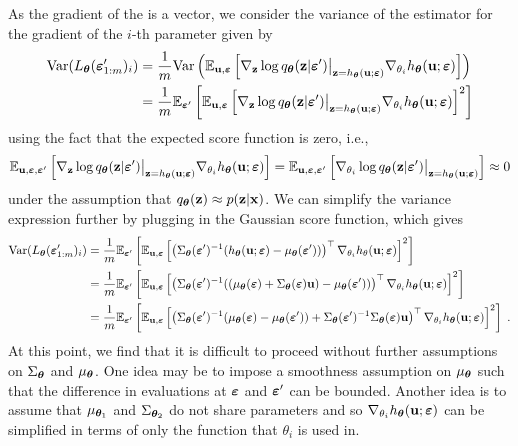 \documentclass[10pt]{article}
\begin{document}
As the gradient of the \elbo is a vector, we consider the variance of the estimator for the gradient of the $i$-th parameter given by
\begin{align*}
\mathrm{Var}(L_{\bm{\theta}}(\bm{\varepsilon}_{1:m}')_i) &= \frac{1}{m}\mathrm{Var}\left(\mathbb{E}_{\mathbf{u},\bm{\varepsilon}}\left[\nabla_{\mathbf{z}}\log q_{\bm{\theta}}(\mathbf{z}|\bm{\varepsilon}')\big|_{\mathbf{z}=h_{\bm{\theta}}(\mathbf{u};\bm{\varepsilon})} \nabla_{\theta_i} h_{\bm{\theta}}(\mathbf{u};\bm{\varepsilon})\right]\right) \\
&= \frac{1}{m}\mathbb{E}_{\bm{\varepsilon}'}\left[\mathbb{E}_{\mathbf{u},\bm{\varepsilon}}\left[\nabla_{\mathbf{z}}\log q_{\bm{\theta}}(\mathbf{z}|\bm{\varepsilon}')\big|_{\mathbf{z}=h_{\bm{\theta}}(\mathbf{u};\bm{\varepsilon})} \nabla_{\theta_i} h_{\bm{\theta}}(\mathbf{u};\bm{\varepsilon})\right]^2\right]
\end{align*}
using the fact that the expected score function is zero, i.e.,
\[
\mathbb{E}_{\mathbf{u},\bm{\varepsilon},\bm{\varepsilon}'}\left[\nabla_{\mathbf{z}}\log q_{\bm{\theta}}(\mathbf{z}|\bm{\varepsilon}')\big|_{\mathbf{z}=h_{\bm{\theta}}(\mathbf{u};\bm{\varepsilon})} \nabla_{\theta_i} h_{\bm{\theta}}(\mathbf{u};\bm{\varepsilon})\right] = \mathbb{E}_{\mathbf{u},\bm{\varepsilon},\bm{\varepsilon}'}\left[\nabla_{\theta_i}\log q_{\bm{\theta}}(\mathbf{z}|\bm{\varepsilon}')\big|_{\mathbf{z}=h_{\bm{\theta}}(\mathbf{u};\bm{\varepsilon})}\right] \approx 0
\]
under the assumption that $q_{\bm{\theta}}(\mathbf{z})\approx p(\mathbf{z}|\mathbf{x})$. We can simplify the variance expression further by plugging in the Gaussian score function, which gives
\begin{align*}
\mathrm{Var}(L_{\bm{\theta}}(\bm{\varepsilon}_{1:m}')_i) &= \frac{1}{m}\mathbb{E}_{\bm{\varepsilon}'}\left[\mathbb{E}_{\mathbf{u},\bm{\varepsilon}}\left[\left(\Sigma_{\bm{\theta}}(\bm{\varepsilon}')^{-1}(h_{\bm{\theta}}(\mathbf{u};\bm{\varepsilon})-\mu_{\bm{\theta}}(\bm{\varepsilon}'))\right)^\top\nabla_{\theta_i} h_\theta(\mathbf{u};\bm{\varepsilon})\right]^2\right] \\
&= \frac{1}{m}\mathbb{E}_{\bm{\varepsilon}'}\left[\mathbb{E}_{\mathbf{u},\bm{\varepsilon}}\left[\left(\Sigma_{\bm{\theta}}(\bm{\varepsilon}')^{-1}(\left(\mu_{\bm{\theta}}(\bm{\varepsilon})+\Sigma_{\bm{\theta}}(\bm{\varepsilon})\mathbf{u}\right)-\mu_{\bm{\theta}}(\bm{\varepsilon}'))\right)^\top\nabla_{\theta_i} h_{\bm{\theta}}(\mathbf{u};\bm{\varepsilon})\right]^2\right] \\
&= \frac{1}{m}\mathbb{E}_{\bm{\varepsilon}'}\left[\mathbb{E}_{\mathbf{u},\bm{\varepsilon}}\left[\left(\Sigma_{\bm{\theta}}(\bm{\varepsilon}')^{-1}(\mu_{\bm{\theta}}(\bm{\varepsilon})-\mu_{\bm{\theta}}(\bm{\varepsilon}'))+\Sigma_{\bm{\theta}}(\bm{\varepsilon}')^{-1}\Sigma_{\bm{\theta}}(\bm{\varepsilon})\mathbf{u}\right)^\top\nabla_{\theta_i} h_{\bm{\theta}}(\mathbf{u};\bm{\varepsilon})\right]^2\right] \;.
\end{align*}
At this point, we find that it is difficult to proceed without further assumptions on $\Sigma_{\bm{\theta}}$ and $\mu_{\bm{\theta}}$. One idea may be to impose a smoothness assumption on $\mu_{\bm{\theta}}$ such that the difference in evaluations at $\bm{\varepsilon}$ and $\bm{\varepsilon}'$ can be bounded. Another idea is to assume that $\mu_{{\bm{\theta}}_1}$ and $\Sigma_{{\bm{\theta}}_2}$ do not share parameters and so $\nabla_{\theta_i}h_{\bm{\theta}}(\mathbf{u};\bm{\varepsilon})$ can be simplified in terms of only the function that $\theta_i$ is used in.
\\
\end{document}
